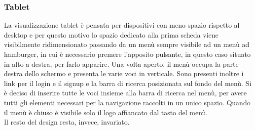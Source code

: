 \subsubsection{Tablet}
\label{ssub:tablet}
La visualizzazione tablet è pensata per dispositivi con meno spazio rispetto al desktop e per questo motivo lo spazio dedicato alla prima scheda viene visibilmente ridimensionato passando da un menù sempre visibile ad un menù ad hamburger, in cui è necessario premere l'apposito pulsante, in questo caso situato in alto a destra, per farlo apparire. Una volta aperto, il menù occupa la parte destra dello schermo e presenta le varie voci in verticale. Sono presenti inoltre i link per il login e il signup e la barra di ricerca posizionata sul fondo del menù. Si è deciso di inserire tutte le voci insieme alla barra di ricerca nel menù, per avere tutti gli elementi necessari per la navigazione raccolti in un unico spazio. Quando il menù è chiuso è visibile solo il logo affiancato dal tasto del menù. \\
Il resto del design resta, invece, invariato.
